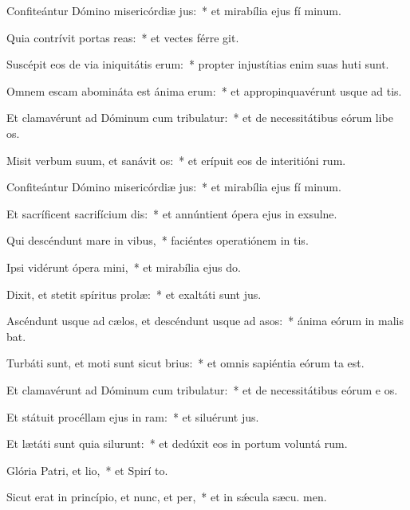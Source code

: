 \item Confiteántur Dómino misericórdiæ jus:~* et mirabília ejus fí minum.
\item Quia contrívit portas reas:~* et vectes férre git.
\item Suscépit eos de via iniquitátis erum:~* propter injustítias enim suas huti sunt.
\item Omnem escam abomináta est ánima erum:~* et appropinquavérunt usque ad  tis.
\item Et clamavérunt ad Dóminum cum tribulatur:~* et de necessitátibus eórum libe os.
\item Misit verbum suum, et sanávit os:~* et erípuit eos de interitióni rum.
\item Confiteántur Dómino misericórdiæ jus:~* et mirabília ejus fí minum.
\item Et sacríficent sacrifícium dis:~* et annúntient ópera ejus in exsulne.
\item Qui descéndunt mare in vibus,~* faciéntes operatiónem in  tis.
\item Ipsi vidérunt ópera mini,~* et mirabília ejus  do.
\item Dixit, et stetit spíritus prolæ:~* et exaltáti sunt  jus.
\item Ascéndunt usque ad cælos, et descéndunt usque ad asos:~* ánima eórum in malis bat.
\item Turbáti sunt, et moti sunt sicut brius:~* et omnis sapiéntia eórum ta est.
\item Et clamavérunt ad Dóminum cum tribulatur:~* et de necessitátibus eórum e os.
\item Et státuit procéllam ejus in ram:~* et siluérunt  jus.
\item Et lætáti sunt quia silurunt:~* et dedúxit eos in portum voluntá rum.
\item Glória Patri, et lio,~* et Spirí to.
\item Sicut erat in princípio, et nunc, et per,~* et in sǽcula sæcu. men.
